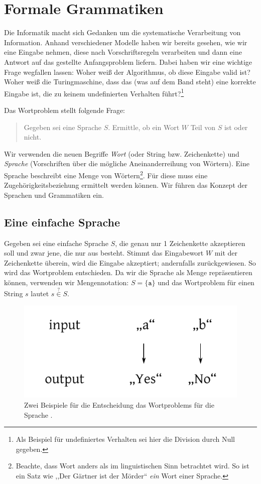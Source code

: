 \chapter{Formale Grammatiken}
%
Die Informatik macht sich Gedanken um die systematische Verarbeitung von Information. Anhand verschiedener Modelle haben wir bereits gesehen, wie wir eine Eingabe nehmen, diese nach Vorschriftsregeln verarbeiten und dann eine Antwort auf das gestellte Anfangsproblem liefern. Dabei haben wir eine wichtige Frage wegfallen lassen: Woher weiß der Algorithmus, ob diese Eingabe valid ist? Woher weiß die Turingmaschine, dass das (was auf dem Band steht) eine korrekte Eingabe ist, die zu keinem undefinierten Verhalten führt?\footnote{Als Beispiel für undefiniertes Verhalten sei hier die Division durch Null gegeben.}

Das Wortproblem stellt folgende Frage:
\begin{quotation}
  Gegeben sei eine Sprache $S$. Ermittle, ob ein Wort $W$ Teil von $S$ ist oder nicht.
\end{quotation}
%
Wir verwenden die neuen Begriffe \emph{Wort} (oder String bzw. Zeichenkette) und \emph{Sprache} (Vorschriften über die mögliche Aneinanderreihung von Wörtern). Eine Sprache beschreibt eine Menge von Wörtern\footnote{Beachte, dass Wort anders als im linguistischen Sinn betrachtet wird. So ist ein Satz wie ,,Der Gärtner ist der Mörder`` \emph{ein} Wort einer Sprache.}. Für diese muss eine Zugehörigkeitsbeziehung ermittelt werden können. Wir führen das Konzept der Sprachen und Grammatiken ein.

\section{Eine einfache Sprache}
%
Gegeben sei eine einfache Sprache $S$, die genau nur 1 Zeichenkette akzeptieren soll und zwar jene, die nur aus  besteht. Stimmt das Eingabewort $W$ mit der Zeichenkette  überein, wird die Eingabe akzeptiert; andernfalls zurückgewiesen. So wird das Wortproblem entschieden. Da wir die Sprache als Menge repräsentieren können, verwenden wir Mengennotation: $S = \{\texttt{a}\}$ und das Wortproblem für einen String $s$ lautet $s \stackrel{?}{\in} S$.
%
\begin{figure}[ht]
 \begin{center}
  \includegraphics{img/wordproblem.pdf}
  \caption{Zwei Beispiele für die Entscheidung das Wortproblems für die Sprache .}
  \label{fig:wordproblem}
 \end{center}
\end{figure}

